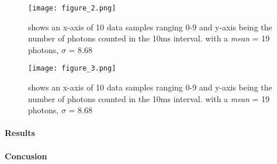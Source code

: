 \documentclass[12 pt,twoside]{article}
\begin{document}
\begin{center}
\begin{figure}[!hb]
\texttt{[image: figure\_2.png]}
\caption{\small{shows an x-axis of 10 data samples ranging 0-9 and y-axis being the number of photons counted in the 10ms interval. with a {\it mean} = 19 photons, $\sigma$ = 8.68 }}
\end{figure}
\end{center}

\begin{center}
\begin{figure}[!hb]
\texttt{[image: figure\_3.png]}
\caption{\small{shows an x-axis of 10 data samples ranging 0-9 and y-axis being the number of photons counted in the 10ms interval. with a {\it mean} = 19 photons, $\sigma$ = 8.68 }}
\end{figure}
\end{center}

\paragraph{Results}

\paragraph{Concusion}
\end{document}
